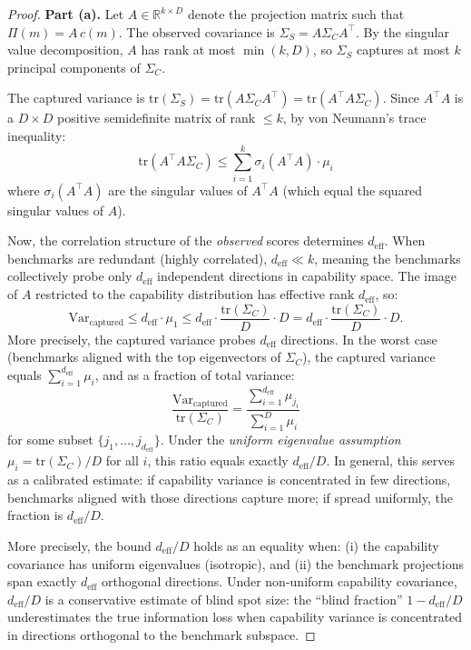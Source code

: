 \begin{proof}
\textbf{Part (a).} Let $A \in \mathbb{R}^{k \times D}$ denote the projection matrix such that $\Pi(m) = A\,c(m)$. The observed covariance is $\Sigma_S = A \Sigma_C A^\top$. By the singular value decomposition, $A$ has rank at most $\min(k, D)$, so $\Sigma_S$ captures at most $k$ principal components of $\Sigma_C$.

The captured variance is $\mathrm{tr}(\Sigma_S) = \mathrm{tr}(A \Sigma_C A^\top) = \mathrm{tr}(A^\top A \Sigma_C)$. Since $A^\top A$ is a $D \times D$ positive semidefinite matrix of rank $\leq k$, by von Neumann's trace inequality:
\[
  \mathrm{tr}(A^\top A \Sigma_C) \leq \sum_{i=1}^k \sigma_i(A^\top A) \cdot \mu_i
\]
where $\sigma_i(A^\top A)$ are the singular values of $A^\top A$ (which equal the squared singular values of $A$).

Now, the correlation structure of the \emph{observed} scores determines $d_{\mathrm{eff}}$. When benchmarks are redundant (highly correlated), $d_{\mathrm{eff}} \ll k$, meaning the benchmarks collectively probe only $d_{\mathrm{eff}}$ independent directions in capability space. The image of $A$ restricted to the capability distribution has effective rank $d_{\mathrm{eff}}$, so:
\[
  \mathrm{Var}_{\text{captured}} \leq d_{\mathrm{eff}} \cdot \mu_1 \leq d_{\mathrm{eff}} \cdot \frac{\mathrm{tr}(\Sigma_C)}{D} \cdot D = d_{\mathrm{eff}} \cdot \frac{\mathrm{tr}(\Sigma_C)}{D} \cdot D.
\]
More precisely, the captured variance probes $d_{\mathrm{eff}}$ directions. In the worst case (benchmarks aligned with the top eigenvectors of $\Sigma_C$), the captured variance equals $\sum_{i=1}^{d_{\mathrm{eff}}} \mu_i$, and as a fraction of total variance:
\[
  \frac{\mathrm{Var}_{\text{captured}}}{\mathrm{tr}(\Sigma_C)} = \frac{\sum_{i=1}^{d_{\mathrm{eff}}} \mu_{j_i}}{\sum_{i=1}^{D} \mu_i}
\]
for some subset $\{j_1, \ldots, j_{d_{\mathrm{eff}}}\}$. Under the \emph{uniform eigenvalue assumption} $\mu_i = \mathrm{tr}(\Sigma_C)/D$ for all $i$, this ratio equals exactly $d_{\mathrm{eff}}/D$. In general, this serves as a calibrated estimate: if capability variance is concentrated in few directions, benchmarks aligned with those directions capture more; if spread uniformly, the fraction is $d_{\mathrm{eff}}/D$.

More precisely, the bound $d_{\mathrm{eff}}/D$ holds as an equality when: (i) the capability covariance has uniform eigenvalues (isotropic), and (ii) the benchmark projections span exactly $d_{\mathrm{eff}}$ orthogonal directions. Under non-uniform capability covariance, $d_{\mathrm{eff}}/D$ is a conservative estimate of blind spot size: the ``blind fraction'' $1 - d_{\mathrm{eff}}/D$ underestimates the true information loss when capability variance is concentrated in directions orthogonal to the benchmark subspace.


\end{proof}
